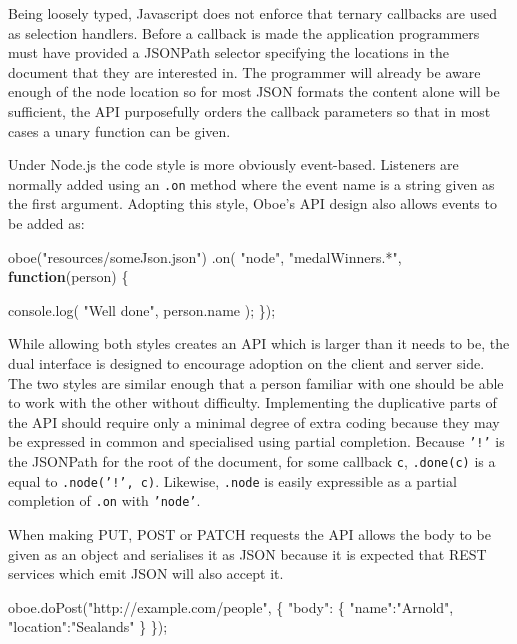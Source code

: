 \documentclass[12pt, ]{article}
\newenvironment{Shaded}{}{}
\newcommand{\KeywordTok}[1]{\textcolor[rgb]{0.00,0.44,0.13}{\textbf{{#1}}}}
\newcommand{\StringTok}[1]{\textcolor[rgb]{0.25,0.44,0.63}{{#1}}}
\newcommand{\OtherTok}[1]{\textcolor[rgb]{0.00,0.44,0.13}{{#1}}}
\newcommand{\FunctionTok}[1]{\textcolor[rgb]{0.02,0.16,0.49}{{#1}}}
\newcommand{\NormalTok}[1]{{#1}}
\begin{document}
Being loosely typed, Javascript does not enforce that ternary callbacks
are used as selection handlers. Before a callback is made the
application programmers must have provided a JSONPath selector
specifying the locations in the document that they are interested in.
The programmer will already be aware enough of the node location so for
most JSON formats the content alone will be sufficient, the API
purposefully orders the callback parameters so that in most cases a
unary function can be given.

Under Node.js the code style is more obviously event-based. Listeners
are normally added using an \texttt{.on} method where the event name is
a string given as the first argument. Adopting this style, Oboe's API
design also allows events to be added as:

\begin{Shaded}
\begin{Highlighting}[]
\FunctionTok{oboe}\NormalTok{(}\StringTok{"resources/someJson.json"}\NormalTok{)}
   \NormalTok{.}\FunctionTok{on}\NormalTok{( }\StringTok{"node"}\NormalTok{, }\StringTok{"medalWinners.*"}\NormalTok{, }\KeywordTok{function}\NormalTok{(person) \{}
   
      \OtherTok{console}\NormalTok{.}\FunctionTok{log}\NormalTok{( }\StringTok{"Well done"}\NormalTok{, }\OtherTok{person}\NormalTok{.}\FunctionTok{name} \NormalTok{);}
   \NormalTok{\});}
\end{Highlighting}
\end{Shaded}

While allowing both styles creates an API which is larger than it needs
to be, the dual interface is designed to encourage adoption on the
client and server side. The two styles are similar enough that a person
familiar with one should be able to work with the other without
difficulty. Implementing the duplicative parts of the API should require
only a minimal degree of extra coding because they may be expressed in
common and specialised using partial completion. Because \texttt{'!'} is
the JSONPath for the root of the document, for some callback \texttt{c},
\texttt{.done(c)} is a equal to \texttt{.node('!', c)}. Likewise,
\texttt{.node} is easily expressible as a partial completion of
\texttt{.on} with \texttt{'node'}.

When making PUT, POST or PATCH requests the API allows the body to be
given as an object and serialises it as JSON because it is expected that
REST services which emit JSON will also accept it.

\begin{Shaded}
\begin{Highlighting}[]
\OtherTok{oboe}\NormalTok{.}\FunctionTok{doPost}\NormalTok{(}\StringTok{"http://example.com/people"}\NormalTok{, \{}
   \StringTok{"body"}\NormalTok{: \{}
      \StringTok{"name"}\NormalTok{:}\StringTok{"Arnold"}\NormalTok{, }\StringTok{"location"}\NormalTok{:}\StringTok{"Sealands"}
   \NormalTok{\}}
\NormalTok{\});}
\end{Highlighting}
\end{Shaded}
\end{document}
